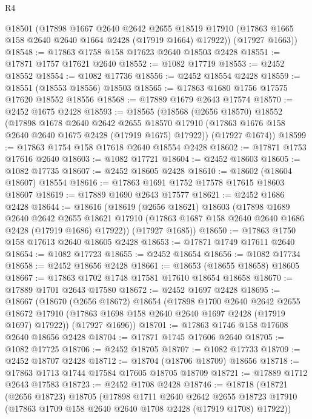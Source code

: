 \begin{lexlean}{R4}
\begin{coremodule}
      @18501
      (@17898
        @1667
        @2640
        @2642
        @2655
        @18519
        @17910
        (@17863 @1665 @158 @2640 @2640 @1664 @2428 (@17919 @1664) @17922))
      (@17927 @1663))
@18548 := @17863 @1758 @158 @17623 @2640 @18503 @2428
@18551 := @17871 @1757 @17621 @2640
@18552 := @1082 @17719
@18553 := @2452 @18552
@18554 := @1082 @17736
@18556 := @2452 @18554 @2428
@18559 := @18551 (@18553 @18556) @18503
@18565 := @17863 @1680 @1756 @17575 @17620 @18552 @18556
@18568 := @17889 @1679 @2643 @17574
@18570 := @2452 @1675 @2428
@18593 := @18565
    (@18568
      (@2656 @18570)
      @18552
      (@17898
        @1678
        @2640
        @2642
        @2655
        @18570
        @17910
        (@17863 @1676 @158 @2640 @2640 @1675 @2428 (@17919 @1675) @17922))
      (@17927 @1674))
@18599 := @17863 @1754 @158 @17618 @2640 @18554 @2428
@18602 := @17871 @1753 @17616 @2640
@18603 := @1082 @17721
@18604 := @2452 @18603
@18605 := @1082 @17735
@18607 := @2452 @18605 @2428
@18610 := @18602 (@18604 @18607) @18554
@18616 := @17863 @1691 @1752 @17578 @17615 @18603 @18607
@18619 := @17889 @1690 @2643 @17577
@18621 := @2452 @1686 @2428
@18644 := @18616
    (@18619
      (@2656 @18621)
      @18603
      (@17898
        @1689
        @2640
        @2642
        @2655
        @18621
        @17910
        (@17863 @1687 @158 @2640 @2640 @1686 @2428 (@17919 @1686) @17922))
      (@17927 @1685))
@18650 := @17863 @1750 @158 @17613 @2640 @18605 @2428
@18653 := @17871 @1749 @17611 @2640
@18654 := @1082 @17723
@18655 := @2452 @18654
@18656 := @1082 @17734
@18658 := @2452 @18656 @2428
@18661 := @18653 (@18655 @18658) @18605
@18667 := @17863 @1702 @1748 @17581 @17610 @18654 @18658
@18670 := @17889 @1701 @2643 @17580
@18672 := @2452 @1697 @2428
@18695 := @18667
    (@18670
      (@2656 @18672)
      @18654
      (@17898
        @1700
        @2640
        @2642
        @2655
        @18672
        @17910
        (@17863 @1698 @158 @2640 @2640 @1697 @2428 (@17919 @1697) @17922))
      (@17927 @1696))
@18701 := @17863 @1746 @158 @17608 @2640 @18656 @2428
@18704 := @17871 @1745 @17606 @2640
@18705 := @1082 @17725
@18706 := @2452 @18705
@18707 := @1082 @17733
@18709 := @2452 @18707 @2428
@18712 := @18704 (@18706 @18709) @18656
@18718 := @17863 @1713 @1744 @17584 @17605 @18705 @18709
@18721 := @17889 @1712 @2643 @17583
@18723 := @2452 @1708 @2428
@18746 := @18718
    (@18721
      (@2656 @18723)
      @18705
      (@17898
        @1711
        @2640
        @2642
        @2655
        @18723
        @17910
        (@17863 @1709 @158 @2640 @2640 @1708 @2428 (@17919 @1708) @17922))

\end{coremodule}
\end{lexlean}
